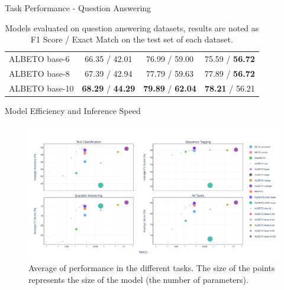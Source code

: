 \documentclass[aspectratio=169,xcolor=dvipsnames]{beamer}
\begin{document}
\begin{frame}{Task Performance - Question Answering}
\begin{table}[]
\begin{center}
{\begin{tabular}{lccc}
ALBETO base-6     & 66.35 / 42.01          & 76.99 / 59.00 & 75.59 / \textbf{56.72}          \\
ALBETO base-8     & 67.39 / 42.94          & 77.79 / 59.63 & 77.89 / \textbf{56.72}          \\
ALBETO base-10    & \textbf{68.29} / \textbf{44.29}          & \textbf{79.89} / \textbf{62.04} & \textbf{78.21} / 56.21          \\ \hline
\end{tabular}}
\end{center}
\caption{Models evaluated on question answering datasets, results are noted as F1 Score / Exact Match on the test set of each dataset.}
\label{table:results-qa}
\end{table}

\end{frame}
\begin{frame}{Model Efficiency and Inference Speed}

\centering
\begin{figure}
    \includegraphics[width=0.95\columnwidth]{images/plot-avg-macs.pdf}
    \caption{Average of performance in the different tasks. The size of the points represents the size of the model (the number of parameters).}
    \label{fig:avg-macs-tasks}
\end{figure}

\end{frame}
\end{document}
